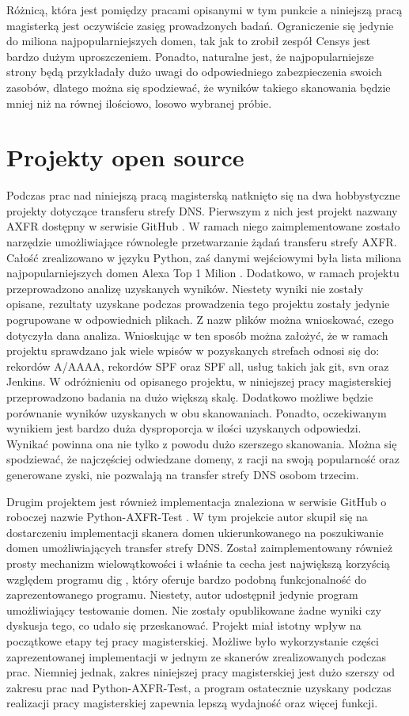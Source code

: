 Różnicą, która jest pomiędzy pracami opisanymi w tym punkcie a niniejszą pracą magisterką jest oczywiście zasięg prowadzonych badań.
Ograniczenie się jedynie do miliona najpopularniejszych domen, tak jak to zrobił zespół Censys \cite{censys} jest bardzo dużym
uproszczeniem. Ponadto, naturalne jest, że najpopularniejsze strony będą przykładały dużo uwagi do odpowiedniego zabezpieczenia
swoich zasobów, dlatego można się spodziewać, że wyników takiego skanowania będzie mniej niż na równej ilościowo, losowo wybranej próbie.

\section{Projekty open source}
Podczas prac nad niniejszą pracą magisterską natknięto się na dwa hobbystyczne projekty dotyczące transferu strefy DNS. Pierwszym z nich
jest projekt nazwany AXFR dostępny w serwisie GitHub \cite{asg-axfr}. W ramach niego zaimplementowane zostało narzędzie umożliwiające
równoległe przetwarzanie żądań transferu strefy AXFR. Całość zrealizowano w języku Python, zaś danymi wejściowymi była lista miliona
najpopularniejszych domen Alexa Top 1 Milion \cite{alexa}. Dodatkowo, w ramach projektu przeprowadzono analizę uzyskanych wyników.
Niestety wyniki nie zostały opisane, rezultaty uzyskane podczas prowadzenia tego projektu zostały jedynie pogrupowane w odpowiednich
plikach. Z nazw plików można wnioskować, czego dotyczyła dana analiza. Wnioskując w ten sposób można założyć, że w ramach projektu
sprawdzano jak wiele wpisów w pozyskanych strefach odnosi się do: rekordów A/AAAA, rekordów SPF oraz SPF all, usług takich jak git,
svn oraz Jenkins. W odróżnieniu od opisanego projektu, w niniejszej pracy magisterskiej przeprowadzono badania na dużo większą skalę.
Dodatkowo możliwe będzie porównanie wyników uzyskanych w obu skanowaniach. Ponadto, oczekiwanym wynikiem jest bardzo duża dysproporcja
w ilości uzyskanych odpowiedzi. Wynikać powinna ona nie tylko z powodu dużo szerszego skanowania. Można się spodziewać, że
najczęściej odwiedzane domeny, z racji na swoją popularność oraz generowane zyski, nie pozwalają na transfer strefy DNS osobom trzecim.

Drugim projektem jest również implementacja znaleziona w serwisie GitHub o roboczej nazwie Python-AXFR-Test \cite{python_axfr_test}.
W tym projekcie autor skupił się na dostarczeniu implementacji skanera domen ukierunkowanego na poszukiwanie domen umożliwiających
transfer strefy DNS. Został zaimplementowany również prosty mechanizm wielowątkowości i właśnie ta cecha jest największą korzyścią
względem programu dig \cite{dig}, który oferuje bardzo podobną funkcjonalność do zaprezentowanego programu. Niestety, autor udostępnił
jedynie program umożliwiający testowanie domen. Nie zostały opublikowane żadne wyniki czy dyskusja tego, co udało się przeskanować.
Projekt miał istotny wpływ na początkowe etapy tej pracy magisterskiej. Możliwe było wykorzystanie części zaprezentowanej implementacji
w jednym ze skanerów zrealizowanych podczas prac. Niemniej jednak, zakres niniejszej pracy magisterskiej jest dużo szerszy od zakresu
prac nad Python-AXFR-Test, a program ostatecznie uzyskany podczas realizacji pracy magisterskiej zapewnia lepszą wydajność oraz
więcej funkcji.

